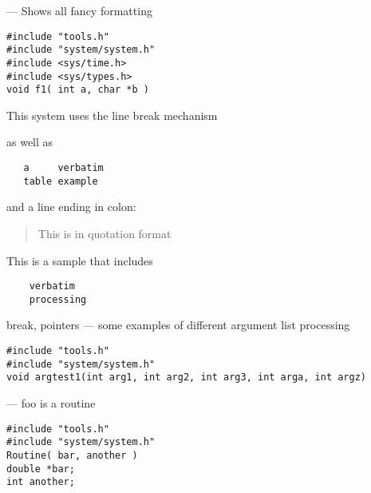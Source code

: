 \startmanpage
{}
--- Shows all fancy formatting 
\startvb\begin{verbatim}
#include "tools.h"
#include "system/system.h"
#include <sys/time.h> 
#include <sys/types.h> 
void f1( int a, char *b )
\end{verbatim}
\endvb

\par
{}
\par
{}
This system uses the line
\nextline
break mechanism
\nextline
\par
as well as
\begin{verbatim}
   a     verbatim
   table example
\end{verbatim}

and a line ending in colon:
\par
\begin{quotation}\noindent
This is in quotation format
\end{quotation}
\par
\par
{}
This is a sample that includes
\begin{verbatim}
    verbatim 
    processing
\end{verbatim}

\par
{}
break, pointers
\nextline
{}
\endmanpage
\startmanpage
{}
--- some examples of different argument list processing 
\startvb\begin{verbatim}
#include "tools.h"
#include "system/system.h"
void argtest1(int arg1, int arg2, int arg3, int arga, int argz)
\end{verbatim}
\endvb

\par
{}
\par
{}
\par
{}
\endmanpage
\startmanpage
{}
--- foo is a routine  
\startvb\begin{verbatim}
#include "tools.h"
#include "system/system.h"
Routine( bar, another )
double *bar;
int another;
\end{verbatim}
\endvb

